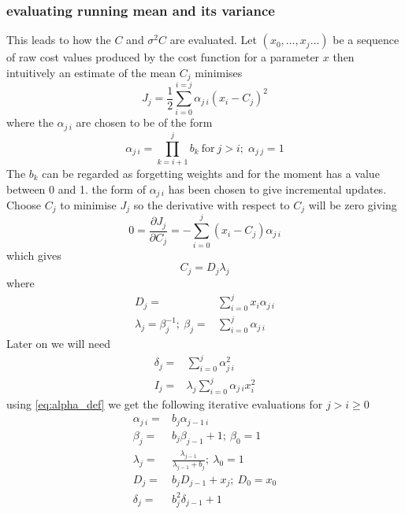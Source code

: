 \documentclass[a4paper,oneside,english]{book}
\numberwithin{equation}{section}
\numberwithin{figure}{section}
\begin{document}
\subsubsection{ evaluating running mean and its variance}
This leads to how the $C$ and $\sigma ^2C$ are evaluated. Let $(x_0, \ldots, x_ j \dots )$ be a sequence of raw cost values produced by the cost function for a  parameter $x$ then intuitively an estimate of the mean $C_j$ minimises
\begin{equation}\label{eq:J_j}
J_j=\frac{1}{2}\sum_{i=0}^{i=j}\alpha_{j\:i}(x_i-C_j)^2
\end{equation}
where the $\alpha_{j\:i}$ are chosen to be of the form 
\begin{equation}\label{eq:alpha_def}
\alpha_{j\:i}=\prod_{k=i+1}^{j}b_k\: \mathrm{for}\: j>i ;\; \alpha_{j\:j}=1
\end{equation}
The $b_k$ can be regarded as forgetting weights and for the moment has a value between 0 and 1. the form of $\alpha_{j\:i}$  has been chosen to give incremental updates. Choose $C_j$ to minimise $J_j$ so the derivative with respect to $C_j$ will be zero giving
\begin{equation}\label{eq:J_zero_diff}
0=\dfrac{\partial J_j}{\partial C_j} =-\sum_{i=0}^j (x_i-C_j)\alpha_{j\:i}
\end{equation}
which gives
\begin{equation}\label{eq:C_j_def}
C_j= D_j \lambda_j
\end{equation}
where
\begin{align}
D_j =&\sum_{i=0}^j x_i \alpha_{j\:i}\label{eq:D_j_def} \\
\lambda_j=\beta_j^{-1};\:\beta_j=&\sum_{i=0}^j \alpha_{j\:i}\label{ eq:lambda_j_def}
\end{align}
Later on we will need
\begin{align}\label{delta_j_def}
\delta_j=&\sum_{i=0}^j \alpha_{j\:i}^2\\
I_j=&\lambda_j \sum_{i=0}^j \alpha_{j\:i} x_i^2
\end{align} 
using \ref{eq:alpha_def} we get the following iterative evaluations for $j > i\geq 0$
\begin{align}
\alpha_{j\:i}=&b_j \alpha_{j-1\:i}\\
\beta_j=&b_j \beta_{j-1} + 1;\:\beta_0=1 \label{eq:beta_j_iter}\\
\lambda_j=&\frac{\lambda_{j-1}}{\lambda_{j-1} + b_j} ; \: \lambda_0=1  \label{eq:lambda_iter}\\
D_j=&b_j D_{j-1} + x_j ; \: D_0=x_0\\
\delta_j=& b_j^2 \delta_{j-1}+1 \label{eq:delta_iter}
\end{align}
\end{document}
